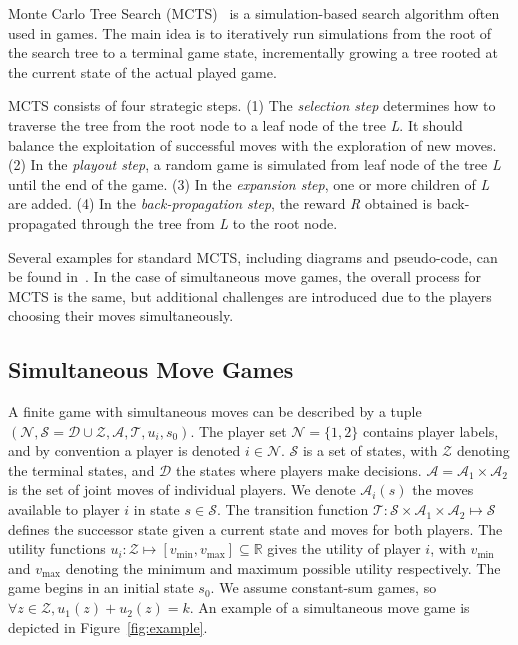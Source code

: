 \documentclass[conference]{IEEEtran}
\newcommand{\cA}{\mathcal{A}}
\newcommand{\cD}{\mathcal{D}}
\newcommand{\cN}{\mathcal{N}}
\newcommand{\cS}{\mathcal{S}}
\newcommand{\cT}{\mathcal{T}}
\newcommand{\cZ}{\mathcal{Z}}
\begin{document}
Monte Carlo Tree Search (MCTS)~\cite{Coulom06Efficient,Kocsis06Bandit} is a simulation-based search algorithm often 
used in games. The main idea is to iteratively run simulations from the root of the search tree to a terminal 
game state, incrementally growing a tree rooted at the current state of the actual played game. 

MCTS consists of four strategic steps. (1) The \textit{selection step} determines how to traverse the tree from the 
root node to a leaf node of the tree \textit{L}. It should balance the exploitation of successful moves with the 
exploration of new moves. (2) In the \textit{playout step}, a random game is simulated from leaf node of the tree 
\textit{L} until the end of the game.  (3) In the \textit{expansion step}, one or more children of \textit{L} are 
added. (4) In the \textit{back-propagation step}, the reward \textit{R} obtained is back-propagated through the tree 
from \textit{L} to the root node.

Several examples for standard MCTS, including diagrams and pseudo-code, can be found in~\cite{Browne12MCTSSurvey}.
In the case of simultaneous move games, the overall process for MCTS is the same, but additional challenges are 
introduced due to the players choosing their moves simultaneously.

\subsection{Simultaneous Move Games}

A finite game with simultaneous moves can be described by a tuple 
$(\cN, \cS = \cD \cup \cZ, \cA, \cT, u_i, s_0)$. The player set $\cN = \{ 1, 2 \}$ contains player 
labels, and by convention a player is denoted $i \in \cN$.
$\cS$ is a set of states, with $\cZ$ denoting the terminal states, and $\cD$ the states where players make decisions.
$\cA = \cA_1 \times \cA_2$ is the set of joint moves of individual players. We denote $\cA_i(s)$ the moves available 
to player $i$ in state $s \in \cS$. The 
transition function $\cT : \cS \times \cA_1 \times \cA_2 \mapsto \cS$ defines the successor state given a current 
state and moves for both players. The utility functions 
$u_i : \cZ \mapsto [v_{\min}, v_{\max}] \subseteq \mathbb{R}$ gives the utility of player $i$, with 
$v_{\min}$ and $v_{\max}$ denoting the minimum and maximum possible utility respectively. 
The game begins in an initial state $s_0$. We assume constant-sum games, so
$\forall z \in \cZ, u_1(z) + u_2(z) = k$. 
An example of a simultaneous move game is depicted in Figure~\ref{fig:example}. 
\end{document}
